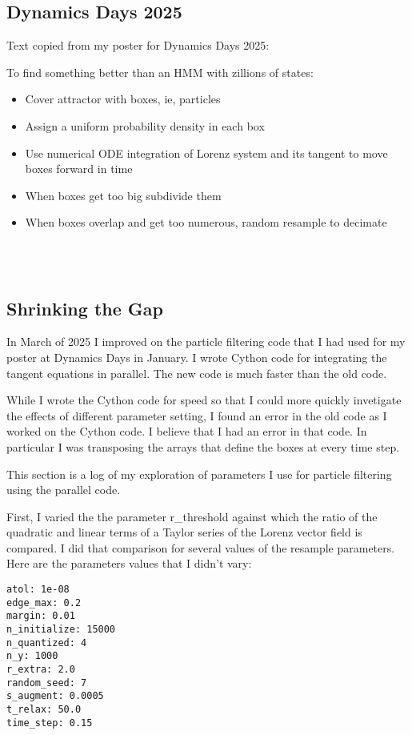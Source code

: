 \documentclass[12pt]{article}
\begin{document}
\subsection{Dynamics Days 2025}
\label{sec:particle_result}

Text copied from my poster for Dynamics Days 2025:

To find something better than an HMM with zillions of states:
\begin{itemize}
\item Cover attractor with boxes, ie, particles
\item Assign a uniform probability density in each box
\item Use numerical ODE integration of Lorenz system and its tangent
  to move boxes forward in time
\item When boxes get too big subdivide them
\item When boxes overlap and get too numerous, random resample to
  decimate
\end{itemize}
\begin{center}
  \\
  \\
\end{center}

\subsection{Shrinking the Gap}
\label{sec:particle_search}

In March of 2025 I improved on the particle filtering code that I had
used for my poster at Dynamics Days in January.  I wrote Cython code
for integrating the tangent equations in parallel.  The new code is
much faster than the old code.

While I wrote the Cython code for speed so that I could more quickly
invetigate the effects of different parameter setting, I found an
error in the old code as I worked on the Cython code.  I believe that
I had an error in that code.  In particular I was transposing the
arrays that define the boxes at every time step.

This section is a log of my exploration of parameters I use for
particle filtering using the parallel code.

First, I varied the the parameter r\_threshold against which the ratio
of the quadratic and linear terms of a Taylor series of the Lorenz
vector field is compared.  I did that comparison for several values of
the resample parameters.  Here are the parameters values that I didn't
vary:
\begin{verbatim}
atol: 1e-08
edge_max: 0.2
margin: 0.01
n_initialize: 15000
n_quantized: 4
n_y: 1000
r_extra: 2.0
random_seed: 7
s_augment: 0.0005
t_relax: 50.0
time_step: 0.15
\end{verbatim}
\end{document}
